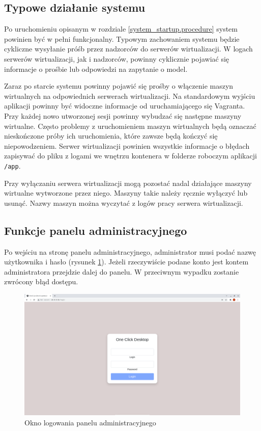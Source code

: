 \documentclass[../opis-rozwiazania.tex]{subfiles}
\begin{document}
\label{system_interaction}

\subsection{Typowe działanie systemu}
Po uruchomieniu opisanym w rozdziale \ref{system_startup.procedure} system powinien być w pełni funkcjonalny.
Typowym zachowaniem systemu będzie cykliczne wysyłanie próśb przez nadzorców do serwerów wirtualizacji.
W logach serwerów wirtualizacji, jak i nadzorców, powinny cyklicznie pojawiać się informacje o prośbie lub odpowiedzi na zapytanie o model.

Zaraz po starcie systemu powinny pojawić się prośby o włączenie maszyn wirtualnych na odpowiednich serwerach wirtualizacji.
Na standardowym wyjściu aplikacji powinny być widoczne informacje od uruchamiającego się Vagranta.
Przy każdej nowo utworzonej sesji powinny wybudzać się następne maszyny wirtualne.
Często problemy z uruchomieniem maszyn wirtualnych będą oznaczać nieskończone próby ich uruchomienia, które zawsze będą kończyć się niepowodzeniem.
Serwer wirtualizacji powinien wszystkie informacje o błędach zapisywać do pliku z logami we wnętrzu kontenera w folderze roboczym aplikacji \texttt{/app}.

Przy wyłączaniu serwera wirtualizacji mogą pozostać nadal działające maszyny wirtualne wytworzone przez niego.
Maszyny takie należy ręcznie wyłączyć lub usunąć.
Nazwy maszyn można wyczytać z logów pracy serwera wirtualizacji.

\subsection{Funkcje panelu administracyjnego}

Po wejściu na stronę panelu administracyjnego, administrator musi podać nazwę użytkownika i hasło (rysunek \ref{figure:system_interaction.admin.login}).
Jeżeli rzeczywiście podane konto jest kontem administratora przejdzie dalej do panelu.
W przeciwnym wypadku zostanie zwrócony błąd dostępu.

\begin{figure}[h!]
  \centering
  \includegraphics[width=\textwidth]{resources/admin_panel_login.png}
  \caption{Okno logowania panelu administracyjnego}
  \label{figure:system_interaction.admin.login}
\end{figure}
\end{document}
